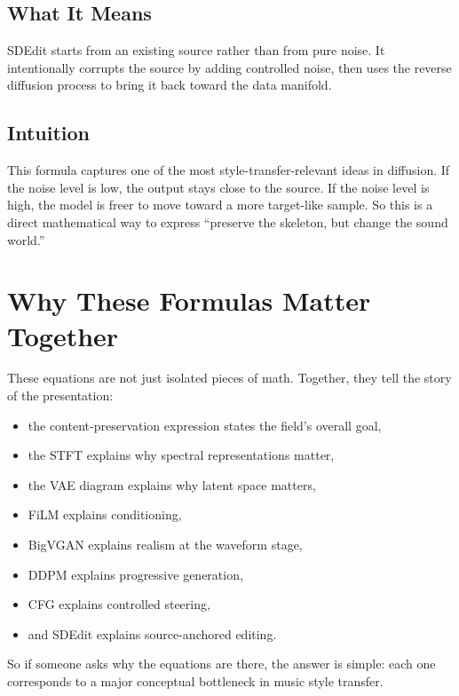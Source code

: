 \documentclass[11pt]{article}
\begin{document}
\subsection*{What It Means}
SDEdit starts from an existing source rather than from pure noise. It intentionally corrupts the source by adding controlled noise, then uses the reverse diffusion process to bring it back toward the data manifold.

\subsection*{Intuition}
This formula captures one of the most style-transfer-relevant ideas in diffusion. If the noise level is low, the output stays close to the source. If the noise level is high, the model is freer to move toward a more target-like sample. So this is a direct mathematical way to express ``preserve the skeleton, but change the sound world.''

\section{Why These Formulas Matter Together}

These equations are not just isolated pieces of math. Together, they tell the story of the presentation:

\begin{itemize}
\item the content-preservation expression states the field's overall goal,
\item the STFT explains why spectral representations matter,
\item the VAE diagram explains why latent space matters,
\item FiLM explains conditioning,
\item BigVGAN explains realism at the waveform stage,
\item DDPM explains progressive generation,
\item CFG explains controlled steering,
\item and SDEdit explains source-anchored editing.
\end{itemize}

So if someone asks why the equations are there, the answer is simple: each one corresponds to a major conceptual bottleneck in music style transfer.
\end{document}
